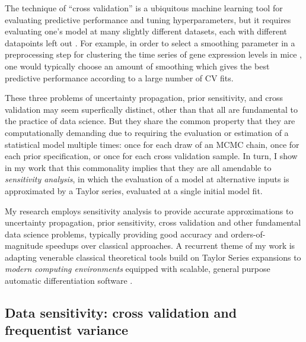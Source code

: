 The technique of ``cross validation'' is a ubiquitous machine learning tool
for evaluating predictive performance and tuning hyperparameters, but it
requires evaluating one's model at many slightly different datasets, each with
different datapoints left out \citep{barnard:1974:cvchoicediscussion,
friedman:2001:esl}.  For example, in order to select a smoothing parameter in a
preprocessing step for clustering the time series of gene expression levels in
mice \citep{shoemaker:2015:ultrasensitive}, one would typically choose an amount
of smoothing which gives the best predictive performance according to a large
number of CV fits.

These three problems of uncertainty propagation, prior sensitivity, and cross
validation may seem superfically distinct, other than that all are fundamental
to the practice of data science.  But they share the common property that they
are computationally demanding due to requiring the evaluation or estimation of a
statistical model multiple times: once for each draw of an MCMC chain, once for
each prior specification, or once for each cross validation sample. In turn, I
show in my work that this commonality implies that they are all amendable to
{\em sensitivity analysis}, in which the evaluation of a model at alternative
inputs is approximated by a Taylor series, evaluated at a single initial model
fit.

My research employs sensitivity analysis to provide accurate approximations to
uncertainty propagation, prior sensitivity, cross validation and other
fundamental data science problems, typically providing good accuracy and
orders-of-magnitude speedups over classical approaches.  A recurrent theme of my
work is adapting venerable classical theoretical tools build on Taylor Series
expansions  \citep{reeds:1976:thesis, gustafson:1996:localposterior,
opper:2001:advancedmeanfield} to {\em modern computing environments} equipped
with scalable, general purpose automatic differentiation software
\citep{baydin:2015:automatic, carpenter:2015:stanmath}.


\subsection*{Data sensitivity: cross validation and frequentist variance}

